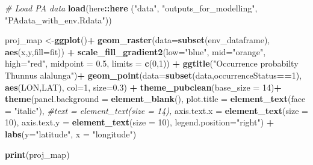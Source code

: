\documentclass[
]{book}
\newenvironment{Shaded}{\begin{snugshade}}{\end{snugshade}}
\newcommand{\AttributeTok}[1]{\textcolor[rgb]{0.13,0.29,0.53}{#1}}
\newcommand{\CommentTok}[1]{\textcolor[rgb]{0.56,0.35,0.01}{\textit{#1}}}
\newcommand{\DecValTok}[1]{\textcolor[rgb]{0.00,0.00,0.81}{#1}}
\newcommand{\FloatTok}[1]{\textcolor[rgb]{0.00,0.00,0.81}{#1}}
\newcommand{\FunctionTok}[1]{\textcolor[rgb]{0.13,0.29,0.53}{\textbf{#1}}}
\newcommand{\NormalTok}[1]{#1}
\newcommand{\OtherTok}[1]{\textcolor[rgb]{0.56,0.35,0.01}{#1}}
\newcommand{\SpecialCharTok}[1]{\textcolor[rgb]{0.81,0.36,0.00}{\textbf{#1}}}
\newcommand{\StringTok}[1]{\textcolor[rgb]{0.31,0.60,0.02}{#1}}
\begin{document}
\begin{Shaded}
\begin{Highlighting}[]
\CommentTok{\# Load PA data}
\FunctionTok{load}\NormalTok{(here}\SpecialCharTok{::}\FunctionTok{here}\NormalTok{ (}\StringTok{"data"}\NormalTok{, }\StringTok{"outputs\_for\_modelling"}\NormalTok{, }\StringTok{"PAdata\_with\_env.Rdata"}\NormalTok{))}


\NormalTok{proj\_map }\OtherTok{\textless{}{-}}\FunctionTok{ggplot}\NormalTok{()}\SpecialCharTok{+}
  \FunctionTok{geom\_raster}\NormalTok{(}\AttributeTok{data=}\FunctionTok{subset}\NormalTok{(env\_dataframe),}
              \FunctionTok{aes}\NormalTok{(x,y,}\AttributeTok{fill=}\NormalTok{fit)) }\SpecialCharTok{+}
  \FunctionTok{scale\_fill\_gradient2}\NormalTok{(}\AttributeTok{low=}\StringTok{"blue"}\NormalTok{, }
                       \AttributeTok{mid=}\StringTok{"orange"}\NormalTok{,}
                       \AttributeTok{high=}\StringTok{"red"}\NormalTok{,}
                       \AttributeTok{midpoint =} \FloatTok{0.5}\NormalTok{,}
                       \AttributeTok{limits =} \FunctionTok{c}\NormalTok{(}\DecValTok{0}\NormalTok{,}\DecValTok{1}\NormalTok{)) }\SpecialCharTok{+}
  \FunctionTok{ggtitle}\NormalTok{(}\StringTok{"Occurrence probabilty Thunnus alalunga"}\NormalTok{)}\SpecialCharTok{+} 
  \FunctionTok{geom\_point}\NormalTok{(}\AttributeTok{data=}\FunctionTok{subset}\NormalTok{(data,occurrenceStatus}\SpecialCharTok{==}\DecValTok{1}\NormalTok{),}
             \FunctionTok{aes}\NormalTok{(LON,LAT),}
             \AttributeTok{col=}\DecValTok{1}\NormalTok{,}
             \AttributeTok{size=}\FloatTok{0.3}\NormalTok{) }\SpecialCharTok{+}
  \FunctionTok{theme\_pubclean}\NormalTok{(}\AttributeTok{base\_size =} \DecValTok{14}\NormalTok{)}\SpecialCharTok{+}
  \FunctionTok{theme}\NormalTok{(}\AttributeTok{panel.background =} \FunctionTok{element\_blank}\NormalTok{(),}
        \AttributeTok{plot.title =} \FunctionTok{element\_text}\NormalTok{(}\AttributeTok{face =} \StringTok{"italic"}\NormalTok{), }
        \CommentTok{\#text = element\_text(size = 14), }
        \AttributeTok{axis.text.x =} \FunctionTok{element\_text}\NormalTok{(}\AttributeTok{size =} \DecValTok{10}\NormalTok{),}
        \AttributeTok{axis.text.y =} \FunctionTok{element\_text}\NormalTok{(}\AttributeTok{size =} \DecValTok{10}\NormalTok{),}
        \AttributeTok{legend.position=}\StringTok{"right"}\NormalTok{) }\SpecialCharTok{+}
  \FunctionTok{labs}\NormalTok{(}\AttributeTok{y=}\StringTok{"latitude"}\NormalTok{, }\AttributeTok{x =} \StringTok{"longitude"}\NormalTok{)}
  
\FunctionTok{print}\NormalTok{(proj\_map)}
\end{Highlighting}
\end{Shaded}
\end{document}
